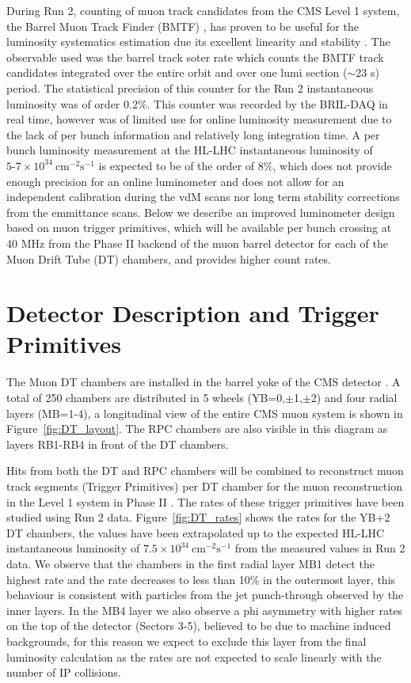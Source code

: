 During Run 2, counting of muon track candidates from the CMS Level 1 system, the Barrel Muon Track Finder (BMTF) ,
has proven to be useful for the luminosity systematics estimation due its excellent linearity and stability \cite{LUM-17-001}.
The observable used was the barrel track soter rate which counts the BMTF track candidates
integrated over the entire orbit and over one lumi section ($\sim$23 s) period.
The statistical precision of this counter for the Run 2 instantaneous luminosity was of order 0.2\%.
This counter was recorded by the BRIL-DAQ in real time,
however was of limited use for online luminosity measurement due to the
lack of per bunch information and relatively long integration time.
A per bunch luminosity measurement at the HL-LHC instantaneous luminosity of
$5\text{-}7\times10^{34}\ \text{cm}^{-2}\text{s}^{-1}$ is expected to be of the order of $8\%$,
which does not provide enough precision for an online luminometer and does not allow for an independent calibration
during the vdM scans nor long term stability corrections from the emmittance scans.
Below we describe an improved luminometer design based on muon trigger primitives, which will be available per bunch crossing at 40 MHz
from the Phase II backend of the muon barrel detector for each of the Muon Drift Tube (DT) chambers, and provides higher count rates.


\section{Detector Description and Trigger Primitives}

The Muon DT chambers are installed in the barrel yoke of the CMS detector \cite{DT-2009}.
A total of 250 chambers are distributed in 5 wheels (YB=0,$\pm$1,$\pm$2) and four radial layers (MB=1-4),
a longitudinal view of the entire  CMS muon system is shown in Figure~\ref{fig:DT_layout}.
The RPC chambers are also visible in this diagram as layers RB1-RB4 in front of the DT chambers.

Hits from both the DT and RPC chambers will be combined to reconstruct muon track segments (Trigger Primitives) per DT chamber for the muon reconstruction in the Level 1 system in Phase II \cite{CERN-LHCC-2017-012}.
The rates of these trigger primitives have been studied using Run 2 data.
Figure~\ref{fig:DT_rates} shows the rates for the YB+2  DT chambers,
the values have been extrapolated up to the expected HL-LHC instantaneous luminosity of  $7.5\times10^{34}\ \text{cm}^{-2}\text{s}^{-1}$ from the measured values in Run 2 data.
We observe that the chambers in the first radial layer MB1 detect the highest rate and the rate decreases to less than 10\% in the outermost layer,
this behaviour is consistent with particles from the jet punch-through observed by the inner layers.
In the MB4 layer we also observe a phi asymmetry with higher rates on the top of the detector (Sectors 3-5), believed to be due to machine induced backgrounds,
for this reason we expect to exclude this layer from the final luminosity calculation as the rates are not expected to scale linearly with the number of IP collisions. 


